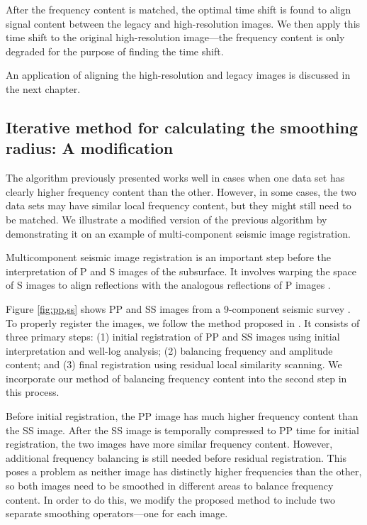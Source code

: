         After the frequency content is matched, the optimal time shift is found to align signal content between the legacy and high-resolution images. We then apply this time shift to the original high-resolution image---the frequency content is only degraded for the purpose of finding the time shift. 
        
        An application of aligning the high-resolution and legacy images is discussed in the next chapter.


\subsection{Iterative method for calculating the smoothing radius: A modification}
        The algorithm previously presented works well in cases when one data set has clearly higher frequency content than the other.
        However, in some cases, the two data sets may have similar local frequency content, but they might still need to be matched.
        We illustrate a modified version of the previous algorithm by demonstrating it on an example of multi-component seismic image registration.

        Multicomponent seismic image registration is an important step before the interpretation of P and S images of the subsurface. It involves warping the space of S images to align reflections with the analogous reflections of P images \cite[]{fomel2003,warp}.

        Figure \ref{fig:pp,ss} shows PP and SS images from a 9-component seismic survey \cite[]{attr}.
        To properly register the images, we follow the method proposed in \cite{warp}. 
        It consists of three primary steps: (1) initial registration of PP and SS images using initial interpretation and well-log analysis; (2) balancing frequency and amplitude content; and (3) final registration using residual local similarity scanning. 
        We incorporate our method of balancing frequency content into the second step in this process.

        Before initial registration, the PP image has much higher frequency content than the SS image. 
        After the SS image is temporally compressed to PP time for initial registration, the two images have more similar frequency content. 
        However, additional frequency balancing is still needed before residual registration. 
        This poses a problem as neither image has distinctly higher frequencies than the other, so both images need to be smoothed in different areas to balance frequency content. 
        In order to do this, we modify the proposed method to include two separate smoothing operators---one for each image.

